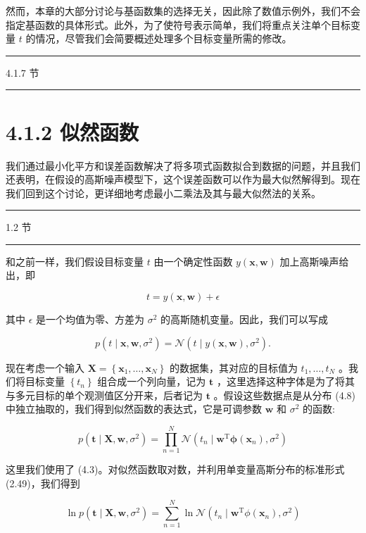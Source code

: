\documentclass[10pt]{article}
\newcommand{\HRule}{\begin{center}\rule{0.9\linewidth}{0.2mm}\end{center}}
\begin{document}
然而，本章的大部分讨论与基函数集的选择无关，因此除了数值示例外，我们不会指定基函数的具体形式。此外，为了使符号表示简单，我们将重点关注单个目标变量 \(t\) 的情况，尽管我们会简要概述处理多个目标变量所需的修改。

\HRule

4.1.7 节

\HRule

\section*{4.1.2 似然函数}

我们通过最小化平方和误差函数解决了将多项式函数拟合到数据的问题，并且我们还表明，在假设的高斯噪声模型下，这个误差函数可以作为最大似然解得到。现在我们回到这个讨论，更详细地考虑最小二乘法及其与最大似然法的关系。

\HRule

1.2 节

\HRule

和之前一样，我们假设目标变量 \(t\) 由一个确定性函数 \(y\left( {\mathbf{x},\mathbf{w}}\right)\) 加上高斯噪声给出，即

\[
t = y\left( {\mathbf{x},\mathbf{w}}\right)  + \epsilon  \tag{4.7}
\]

其中 \(\epsilon\) 是一个均值为零、方差为 \({\sigma }^{2}\) 的高斯随机变量。因此，我们可以写成

\[
p\left( {t \mid  \mathbf{x},\mathbf{w},{\sigma }^{2}}\right)  = \mathcal{N}\left( {t \mid  y\left( {\mathbf{x},\mathbf{w}}\right) ,{\sigma }^{2}}\right) . \tag{4.8}
\]

现在考虑一个输入 \(\mathbf{X} = \left\{  {{\mathbf{x}}_{1},\ldots ,{\mathbf{x}}_{N}}\right\}\) 的数据集，其对应的目标值为 \({t}_{1},\ldots ,{t}_{N}\) 。我们将目标变量 \(\left\{  {t}_{n}\right\}\) 组合成一个列向量，记为 \(\mathbf{t}\) ，这里选择这种字体是为了将其与多元目标的单个观测值区分开来，后者记为 \(\mathbf{t}\) 。假设这些数据点是从分布 (4.8) 中独立抽取的，我们得到似然函数的表达式，它是可调参数 \(\mathbf{w}\) 和 \({\sigma }^{2}\) 的函数:

\[
p\left( {\mathbf{t} \mid  \mathbf{X},\mathbf{w},{\sigma }^{2}}\right)  = \mathop{\prod }\limits_{{n = 1}}^{N}\mathcal{N}\left( {{t}_{n} \mid  {\mathbf{w}}^{\mathrm{T}}\mathbf{\phi }\left( {\mathbf{x}}_{n}\right) ,{\sigma }^{2}}\right)  \tag{4.9}
\]

这里我们使用了 (4.3)。对似然函数取对数，并利用单变量高斯分布的标准形式 (2.49)，我们得到

\[
\ln p\left( {\mathbf{t} \mid  \mathbf{X},\mathbf{w},{\sigma }^{2}}\right)  = \mathop{\sum }\limits_{{n = 1}}^{N}\ln \mathcal{N}\left( {{t}_{n} \mid  {\mathbf{w}}^{\mathrm{T}}\phi \left( {\mathbf{x}}_{n}\right) ,{\sigma }^{2}}\right)
\]
\end{document}
